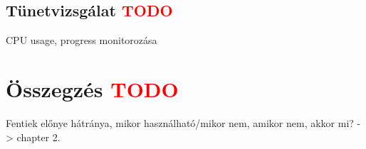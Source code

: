     \subsection{Tünetvizsgálat \textcolor{red}{TODO}} CPU usage, progress monitorozása
    
    
    
\section{Összegzés \textcolor{red}{TODO}} 
Fentiek előnye hátránya, mikor használható/mikor nem, amikor nem, akkor mi? -> chapter 2.
